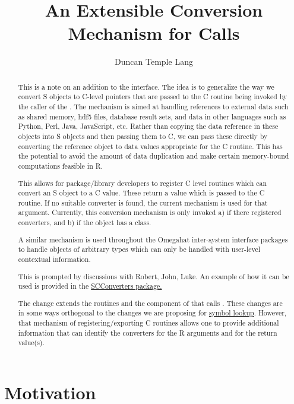 \documentclass{article}
\title{An Extensible Conversion Mechanism for \SFunction{.C} Calls}
\author{Duncan Temple Lang}
\begin{document}
\maketitle
\begin{abstract}
  This is a note on an addition to the  interface. 
  The idea is to generalize the way we convert S objects
  to C-level pointers that are passed to the C routine  being
  invoked by the caller of the .
  The mechanism is aimed at handling references to external data
  such as shared memory, hdf5 files, database result sets, and data in other
  languages such as Python, Perl, Java, JavaScript, etc.
  Rather than copying the data reference in these objects
  into S objects and then passing them to C, we can pass these
  directly by converting the reference object to 
  data values appropriate for the C routine.
  This has the potential to avoid the amount of data duplication
  and make certain memory-bound computations feasible in R.
   

  This allows for package/library developers to register C level
  routines which can convert an S object to a C value.  These return a
   value which is passed to the C routine. If no
  suitable converter is found, the current mechanism is used for that
  argument. Currently, this conversion mechanism is only invoked a) if
  there registered converters, and b) if the object has a class.

  A similar mechanism is used throughout the Omegahat inter-system
  interface packages to handle objects of arbitrary types which can
  only be handled with user-level contextual information. 

  This is prompted by discussions with Robert, John, Luke.  An example
  of how it can be used is provided in the
  \href{http://cm.bell-labs.com/stat/duncan/SCConverters/SCConverters_1.0-0.tar.gz}{SCConverters
  package.}

  The change extends the routines  and the
  component of  that calls .
  These changes are in some ways orthogonal to the changes we are
  proposing for \href{DynamicCSymbols}{symbol lookup}.  However, that
  mechanism of registering/exporting C routines allows one to provide
  additional information that can identify the converters for the R
  arguments and for the return value(s).

  
\end{abstract}

\section{Motivation}
\end{document}
